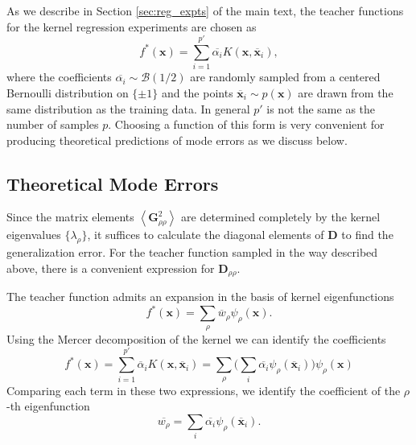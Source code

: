 \documentclass{article}
\begin{document}
As we describe in Section \ref{sec:reg_expts} of the main text, the teacher functions for the kernel regression experiments are chosen as
\begin{equation}
    f^*(\mathbf{x}) = \sum_{i=1}^{p'} \overline{\alpha_{i}} K(\mathbf{x},\mathbf{\overline{x}}_i),
\end{equation}
%
where the coefficients $\overline{ \alpha_i} \sim \mathcal{B}(1/2)$ are randomly sampled from a centered Bernoulli distribution on $\{\pm 1\}$ and the points $\mathbf{\overline{x}}_i \sim p(\mathbf{x})$ are drawn from the same distribution as the training data. In general $p'$ is not the same as the number of samples $p$. Choosing a function of this form is very convenient for producing theoretical predictions of mode errors as we discuss below.

\subsection{Theoretical Mode Errors}

Since the matrix elements $\left< \mathbf{G}_{\rho \rho}^2 \right>$ are determined completely by the kernel eigenvalues $\{\lambda_\rho\}$, it suffices to calculate the diagonal elements of $\mathbf{D}$ to find the generalization error. For the teacher function sampled in the way described above, there is a convenient expression for $ \mathbf{D}_{\rho \rho}$.

The teacher function admits an expansion in the basis of kernel eigenfunctions
\begin{equation}
    f^*(\mathbf{x}) = \sum_\rho \overline{w}_\rho \psi_\rho(\mathbf{x}).
\end{equation}
%
Using the Mercer decomposition of the kernel we can identify the coefficients
\begin{equation}\label{kernel_teacher}
    f^*(\mathbf{x}) = \sum_{i=1}^{p'} \overline{\alpha}_{i} K(\mathbf{x},\mathbf{\overline{x}}_i) = \sum_{\rho} \Big( \sum_{i} \overline{\alpha_i} \psi_\rho(\mathbf{\overline{x}}_i) \Big) \psi_\rho(\mathbf{x})
\end{equation}
%
Comparing each term in these two expressions, we identify the coefficient of the $\rho$-th eigenfunction 
\begin{equation}
    \overline{w_\rho} = \sum_{i} \overline{\alpha_i} \psi_\rho(\mathbf{\overline{x}}_i).
\end{equation}
%
\end{document}
